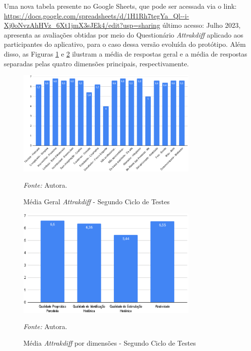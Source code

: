 Uma nova tabela presente no Google Sheets, que pode ser acessada via o link: 
\url{https://docs.google.com/spreadsheets/d/1H1Rh7tegYa_Ql--i-Xj0oNvzAhHVz_6Xt1jmX3sJEk4/edit?usp=sharing} último acesso: Julho 2023, apresenta as avaliações obtidas por meio do Questionário \textit{Attrakdiff} aplicado aos participantes do aplicativo, para o caso 
dessa versão evoluída do protótipo. Além disso, as Figuras \ref{fig28} e \ref{fig29} ilustram a média de respostas geral e a média de respostas separadas pelas quatro dimensões principais, respectivamente.

\begin{figure}[h!]
	\centering
	\caption{Média Geral \textit{Attrakdiff} - Segundo Ciclo de Testes}
	\begin{adjustbox}{center}
		\includegraphics[width=0.8\textwidth]{figuras/media-geral1.eps}
	\end{adjustbox}
	\begin{tablenotes}[flushleft]
		\centering
		\item \textit{Fonte:} Autora.
	\end{tablenotes}
	\label{fig28}
\end{figure}

\begin{figure}[h!]
	\centering
	\caption{Média \textit{Attrakdiff} por dimensões - Segundo Ciclo de Testes}
	\begin{adjustbox}{center}
		\includegraphics[width=0.8\textwidth]{figuras/media-separada1.eps}
	\end{adjustbox}
	\begin{tablenotes}[flushleft]
		\centering
		\item \textit{Fonte:} Autora.
	\end{tablenotes}
	\label{fig29}
\end{figure}


